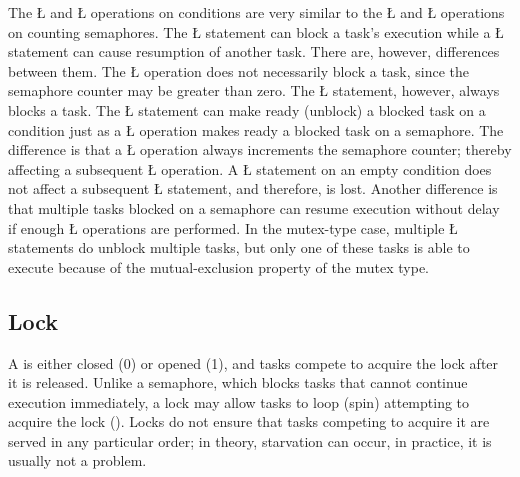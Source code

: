 \documentclass[openright,twoside]{report}
\begin{document}
The \LGinlinetrue\LGbegin\lgrinde\L{}\endlgrinde\LGend{} and \LGinlinetrue\LGbegin\lgrinde\L{}\endlgrinde\LGend{} operations on conditions are very similar to the \LGinlinetrue\LGbegin\lgrinde\L{}\endlgrinde\LGend{} and \LGinlinetrue\LGbegin\lgrinde\L{}\endlgrinde\LGend{} operations on counting semaphores.
The \LGinlinetrue\LGbegin\lgrinde\L{}\endlgrinde\LGend{} statement can block a task's execution while a \LGinlinetrue\LGbegin\lgrinde\L{}\endlgrinde\LGend{} statement can cause resumption of another task.
There are, however, differences between them.
The \LGinlinetrue\LGbegin\lgrinde\L{}\endlgrinde\LGend{} operation does not necessarily block a task, since the semaphore counter may be greater than zero.
The \LGinlinetrue\LGbegin\lgrinde\L{}\endlgrinde\LGend{} statement, however, always blocks a task.
The \LGinlinetrue\LGbegin\lgrinde\L{}\endlgrinde\LGend{} statement can make ready (unblock) a blocked task on a condition just as a \LGinlinetrue\LGbegin\lgrinde\L{}\endlgrinde\LGend{} operation makes ready a blocked task on a semaphore.
The difference is that a \LGinlinetrue\LGbegin\lgrinde\L{}\endlgrinde\LGend{} operation always increments the semaphore counter;
thereby affecting a subsequent \LGinlinetrue\LGbegin\lgrinde\L{}\endlgrinde\LGend{} operation.
A \LGinlinetrue\LGbegin\lgrinde\L{}\endlgrinde\LGend{} statement on an empty condition does not affect a subsequent \LGinlinetrue\LGbegin\lgrinde\L{}\endlgrinde\LGend{} statement, and therefore, is lost.
Another difference is that multiple tasks blocked on a semaphore can resume execution without delay if enough \LGinlinetrue\LGbegin\lgrinde\L{}\endlgrinde\LGend{} operations are performed.
In the mutex-type case, multiple \LGinlinetrue\LGbegin\lgrinde\L{}\endlgrinde\LGend{} statements do unblock multiple tasks, but only one of these tasks is able to execute because of the mutual-exclusion property of the mutex type.


\subsection{Lock}
\label{s:Lock}

A  is either closed (0) or opened (1), and tasks compete to acquire the lock after it is released.
Unlike a semaphore, which blocks tasks that cannot continue execution immediately, a lock may allow tasks to loop (spin) attempting to acquire the lock ().
Locks do not ensure that tasks competing to acquire it are served in any particular order;
in theory, starvation can occur, in practice, it is usually not a problem.
\end{document}
